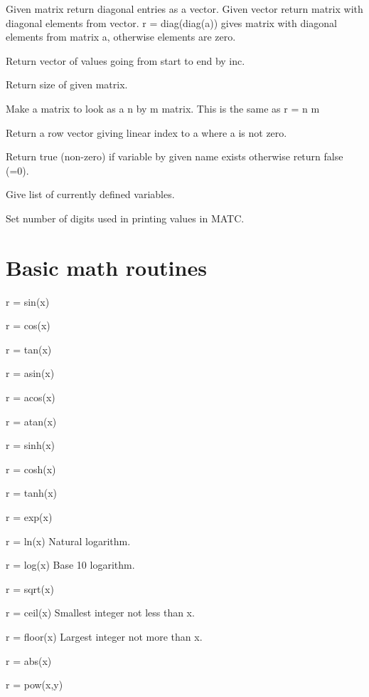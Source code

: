 Given matrix return diagonal entries as a vector. Given vector return matrix with diagonal elements from vector. r = diag(diag(a)) gives matrix with diagonal elements from matrix a, otherwise elements are zero. 

Return vector of values going from start to end by inc. 

Return size of given matrix. 

Make a matrix to look as a n by m matrix. This is the same as r = n m %

Return a row vector giving linear index to a where a is not zero. 

Return true (non-zero) if variable by given name exists otherwise return false (=0). 

Give list of currently defined variables. 

Set number of digits used in printing values in MATC. 
\sifend


\section{Basic math routines}

\ttbegin
r = sin(x)

r = cos(x)

r = tan(x)

r = asin(x)

r = acos(x)

r = atan(x)

r = sinh(x)

r = cosh(x)

r = tanh(x)

r = exp(x)

r = ln(x) Natural logarithm.

r = log(x) Base 10 logarithm.

r = sqrt(x)

r = ceil(x) Smallest integer not less than x.

r = floor(x) Largest integer not more than x.

r = abs(x)

r = pow(x,y) 
\ttend
